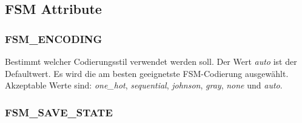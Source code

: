 \subsection{FSM Attribute}
\subsubsection{FSM\_ENCODING}
Bestimmt welcher Codierungsstil verwendet werden soll. Der Wert \textit{auto} ist der Defaultwert. Es wird die am besten geeignetste FSM-Codierung ausgewählt. Akzeptable Werte sind: \textit{one\_hot}, \textit{sequential}, \textit{johnson}, \textit{gray}, \textit{none} und \textit{auto}.

\subsubsection{FSM\_SAVE\_STATE}
